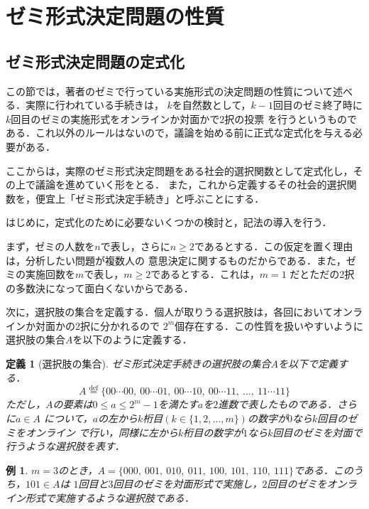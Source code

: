 \documentclass[dvipdfmx]{jsarticle}
\newtheorem{definition}{定義}
\newtheorem{example}{例}
\begin{document}
\section{ゼミ形式決定問題の性質}
\subsection{ゼミ形式決定問題の定式化}
この節では，著者のゼミで行っている実施形式の決定問題の性質について述べる．実際に行われている手続きは，
$k$を自然数として，$k-1$回目のゼミ終了時に$k$回目のゼミの実施形式をオンラインか対面かで2択の投票
を行うというものである．これ以外のルールはないので，議論を始める前に正式な定式化を与える必要がある．

ここからは，実際のゼミ形式決定問題をある社会的選択関数として定式化し，その上で議論を進めていく形をとる．
また，これから定義するその社会的選択関数を，便宜上「ゼミ形式決定手続き」と呼ぶことにする．

はじめに，定式化のために必要ないくつかの検討と，記法の導入を行う．

まず，ゼミの人数を$n$で表し，さらに$n \geq 2$であるとする．この仮定を置く理由は，分析したい問題が複数人の
意思決定に関するものだからである．また，ゼミの実施回数を$m$で表し，$m \geq 2$であるとする．これは，$m=1$
だとただの2択の多数決になって面白くないからである．

次に，選択肢の集合を定義する．個人が取りうる選択肢は，各回においてオンラインか対面かの2択に分かれるので
$2^m$個存在する．この性質を扱いやすいように選択肢の集合$A$を以下のように定義する．

\begin{definition}[選択肢の集合]
  ゼミ形式決定手続きの選択肢の集合$A$を以下で定義する．
  \[
    A \stackrel{\mathrm{def}}{=} \{00\cdots 00,\ 00\cdots 01,\ 00\cdots 10,\ 00\cdots 11,\
    \ldots,\ 11\cdots 11\}
  \]
  ただし，$A$の要素は$0 \leq a \leq 2^m-1$を満たす$a$を$2$進数で表したものである．さらに$a \in A$
  について，$a$の左から$k$桁目$(k \in \{1,2,\ldots,m \})$の数字が$0$なら$k$回目のゼミをオンライン
  で行い，同様に左から$k$桁目の数字が$1$なら$k$回目のゼミを対面で行うような選択肢を表す．
\end{definition}

\begin{example}
  $m=3$のとき，$A = \{000,\ 001,\ 010,\ 011,\ 100,\ 101,\ 110,\ 111 \}$である．このうち，$101 \in A$は
  $1$回目と$3$回目のゼミを対面形式で実施し，$2$回目のゼミをオンライン形式で実施するような選択肢である．
\end{example}
\end{document}
